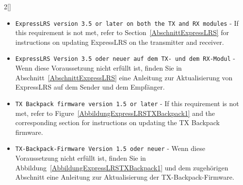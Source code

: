 \begin{paracol}{2}[]
\colende

\renewcommand{\deutschertitel}{Voraussetzungen für die Unterstützung von MAVLink-Telemetrie in ExpressLRS}
\renewcommand{\englischertitel}{Requirements for MAVLink Telemetry Support in ExpressLRS}
\makrounterabschnitt
\label{AbschnittExpressLRSMavlinkAnforderungen}


\begin{itemize}
\item \texttt{ExpressLRS version 3.5 or later on both the TX and RX modules} - If this requirement is not met, refer to Section~\ref{AbschnittExpressLRS} for instructions on updating ExpressLRS on the transmitter and receiver.
\end{itemize}

\colger

\begin{itemize}
\item \texttt{ExpressLRS Version 3.5 oder neuer auf dem TX- und dem RX-Modul} - Wenn diese Voraussetzung nicht erfüllt ist, finden Sie in Abschnitt~\ref{AbschnittExpressLRS} eine Anleitung zur Aktualisierung von ExpressLRS auf dem Sender und dem Empfänger.
\end{itemize}

\coleng

\begin{itemize}
\item \texttt{TX Backpack firmware version 1.5 or later} - If this requirement is not met, refer to Figure~\ref{AbbildungExpressLRSTXBackpack1} and the corresponding section for instructions on updating the TX Backpack firmware.
\end{itemize}

\colger

\begin{itemize}
\item \texttt{TX-Backpack-Firmware Version 1.5 oder neuer} - Wenn diese Voraussetzung nicht erfüllt ist, finden Sie in Abbildung~\ref{AbbildungExpressLRSTXBackpack1} und dem zugehörigen Abschnitt eine Anleitung zur Aktualisierung der TX-Backpack-Firmware.
\end{itemize}

\colende


\renewcommand{\deutschertitel}{Konfiguration von ELRS-Sender, ELRS-Empfänger und TX Backpack für MAVLink-Telemetrie über WLAN}
\renewcommand{\englischertitel}{Configuring the ELRS TX, RX, and TX Backpack for MAVLink Telemetry via WiFi}
\makrounterabschnitt
\label{AbschnittExpressLRSMavlinkTXRXKonfiguration}


\end{paracol}

